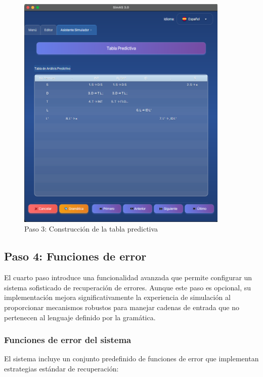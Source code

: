\needspace{8cm}
\begin{figure}[H]
    \centering
    \includegraphics[width=0.9\textwidth]{figuras/simulador/paso3_tablaPredictiva.png}
    \caption{Paso 3: Construcción de la tabla predictiva}
    \label{fig:paso3_tabla_predictiva}
\end{figure}

\subsection{Paso 4: Funciones de error}

El cuarto paso introduce una funcionalidad avanzada que permite configurar un sistema sofisticado de recuperación de errores. Aunque este paso es opcional, su implementación mejora significativamente la experiencia de simulación al proporcionar mecanismos robustos para manejar cadenas de entrada que no pertenecen al lenguaje definido por la gramática.

\subsubsection{Funciones de error del sistema}

El sistema incluye un conjunto predefinido de funciones de error que implementan estrategias estándar de recuperación:

